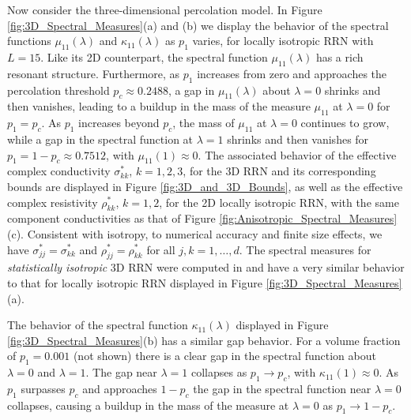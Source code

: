 \documentclass{cmslatex}
\begin{document}
Now consider the three-dimensional percolation model. In Figure
\ref{fig:3D_Spectral_Measures}(a) and (b) we display 
the behavior of the spectral functions $\mu_{11}(\lambda)$ and $\kappa_{11}(\lambda)$
as $p_1$ varies, for locally isotropic RRN with $L=15$. Like its
2D counterpart, the spectral function $\mu_{11}(\lambda)$ has a rich resonant
structure. Furthermore, as $p_1$ increases from zero and approaches
the percolation threshold $p_c\approx0.2488$, a gap in $\mu_{11}(\lambda)$ about
$\lambda=0$ shrinks and then vanishes, leading to a buildup in the mass of
the measure $\mu_{11}$ at $\lambda=0$ for 
$p_1=p_c$. As $p_1$ increases beyond $p_c$, the mass of $\mu_{11}$ at
$\lambda=0$ continues to grow, while a gap in the spectral function at $\lambda=1$ 
shrinks and then vanishes for $p_1=1-p_c\approx0.7512$, with
$\mu_{11}(1)\approx0$. The associated behavior of the effective complex
conductivity $\sigma^*_{kk}$, $k=1,2,3$, for the 3D 
RRN and its corresponding bounds are displayed in Figure
\ref{fig:3D_and_3D_Bounds}, as well as the effective complex
resistivity $\rho^*_{kk}$, $k=1,2$, for the 2D locally isotropic RRN,
with the same component conductivities as that of Figure
\ref{fig:Anisotropic_Spectral_Measures}(c). Consistent with isotropy,
to numerical accuracy and finite size effects, we have
$\sigma^*_{jj}=\sigma^*_{kk}$ and $\rho^*_{jj}=\rho^*_{kk}$ for all $j,k=1,\ldots,d$. The spectral measures for
\emph{statistically isotropic} 3D RRN  were computed in
\cite{Murphy:JMP:063506} and have a very similar behavior to that for
locally isotropic RRN displayed in Figure
\ref{fig:3D_Spectral_Measures}(a).    



The behavior of the spectral function $\kappa_{11}(\lambda)$ displayed in Figure
\ref{fig:3D_Spectral_Measures}(b) has a similar gap behavior. For a
volume fraction of $p_1=0.001$ (not shown) there is a clear gap in the
spectral function about $\lambda=0$ and $\lambda=1$. The gap near $\lambda=1$ collapses
as $p_1\to p_c$, with $\kappa_{11}(1)\approx0$. As $p_1$ surpasses $p_c$ and
approaches $1-p_c$ the gap in the spectral function near $\lambda=0$
collapses, causing a buildup in the mass of the measure at $\lambda=0$ as
$p_1\to1-p_c$. 
\end{document}

